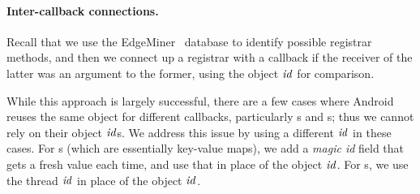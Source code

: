 \paragraph{Inter-callback connections.}

Recall that we use the EdgeMiner~\cite{cao:2015:edgeminer} database to
identify possible registrar methods, and then we connect up a
registrar with a callback if the receiver of the latter was an
argument to the former, using the object $\mathit{id}$ for comparison.

While this approach is largely successful, there are a few cases where
Android reuses the same object for different callbacks, particularly
s and s; thus we cannot rely on their object
$\mathit{id}$s. We address this issue by using a different $\mathit{id}$ in
these cases. For s (which are essentially key-value
maps), we add a \emph{magic id} field that gets a fresh value each
time, and use that in place of the object $\mathit{id}$. For
s, we use the thread $\mathit{id}$ in place of the object
$\mathit{id}$.




